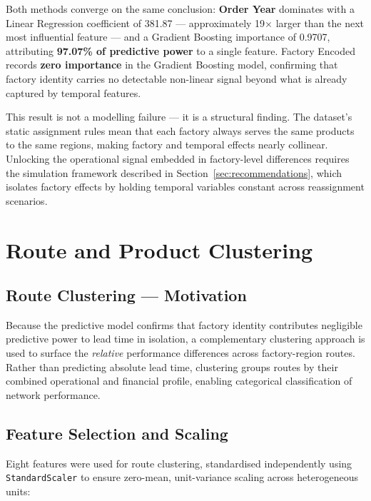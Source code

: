 \documentclass[12pt, a4paper]{article}
\begin{document}
Both methods converge on the same conclusion: \textbf{Order Year}
dominates with a Linear Regression coefficient of 381.87 ---
approximately 19$\times$ larger than the next most influential
feature --- and a Gradient Boosting importance of 0.9707,
attributing \textbf{97.07\% of predictive power} to a single
feature. Factory Encoded records \textbf{zero importance} in
the Gradient Boosting model, confirming that factory identity
carries no detectable non-linear signal beyond what is already
captured by temporal features.

This result is not a modelling failure --- it is a structural
finding. The dataset's static assignment rules mean that each
factory always serves the same products to the same regions,
making factory and temporal effects nearly collinear. Unlocking
the operational signal embedded in factory-level differences
requires the simulation framework described in
Section~\ref{sec:recommendations}, which isolates factory
effects by holding temporal variables constant across
reassignment scenarios.

\section{Route and Product Clustering}
\label{sec:clustering}

\subsection{Route Clustering --- Motivation}

Because the predictive model confirms that factory identity
contributes negligible predictive power to lead time in
isolation, a complementary clustering approach is used to
surface the \emph{relative} performance differences across
factory-region routes. Rather than predicting absolute lead
time, clustering groups routes by their combined operational
and financial profile, enabling categorical classification of
network performance.

\subsection{Feature Selection and Scaling}

Eight features were used for route clustering, standardised
independently using \texttt{StandardScaler} to ensure
zero-mean, unit-variance scaling across heterogeneous units:
\end{document}
